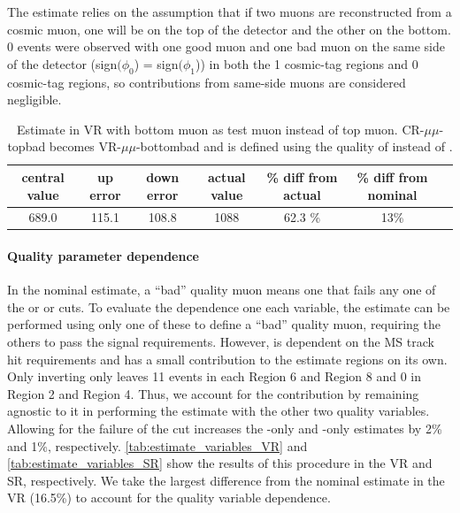 The estimate relies on the assumption that if two muons are reconstructed from a cosmic muon, one will be on the top of the detector and the other on the bottom. 0 events were observed with one good muon and one bad muon on the same side of the detector (sign$(\phi_{0}$) = sign$(\phi_{1}$)) in both the 1 cosmic-tag regions and 0 cosmic-tag regions, so contributions from same-side muons are considered negligible.

\begin{table}
\centering
\small
\begin{tabular}{ccccccc}
central value  & up error & down error & actual value & \% diff from actual & \% diff from nominal\\
\hline
689.0  & 115.1 & 108.8 & 1088 & 62.3 \% & 13\% \\
\hline
\end{tabular}
\caption{Estimate in VR with bottom muon as test muon instead of top muon. CR-$\mu\mu$-topbad becomes VR-$\mu\mu$-bottombad and \rgood is defined using the quality of \mb instead of \mt.}
\label{tab:syst-orientation}
\end{table}


\paragraph{Quality parameter dependence}

In the nominal estimate, a ``bad'' quality muon means one that fails any one of the \nprecision or \nphi or \chiCB cuts. To evaluate the dependence one each variable, the estimate can be performed using only one of these to define a ``bad'' quality muon, requiring the others to pass the signal requirements. However, \chiCB is dependent on the MS track hit requirements and has a small contribution to the estimate regions on its own. Only inverting only \chiCB leaves 11 events in each Region 6 and Region 8 and 0 in Region 2 and Region 4. Thus, we account for the \chiCB contribution by remaining agnostic to it in performing the estimate with the other two quality variables.  Allowing for the failure of the \chiCB cut increases the \nprecision-only and \nphi-only estimates by 2\% and 1\%, respectively. \autoref{tab:estimate_variables_VR} and \autoref{tab:estimate_variables_SR} show the results of this procedure in the VR and SR, respectively. We take the largest difference from the nominal estimate in the VR (16.5\%) to account for the quality variable dependence. 

